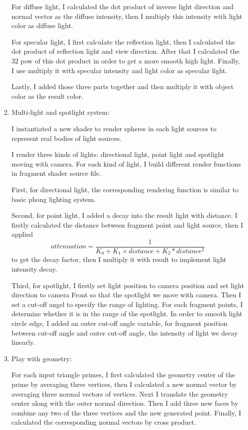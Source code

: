 \documentclass[acmtog]{acmart}
\begin{document}
\begin{enumerate}
	For diffuse light, I calculated the dot product of inverse light direction and normal vector as the diffuse intensity, then I multiply this intensity with light color as diffuse light.\par
	For specular light, I first calculate the reflection light, then I calculated the dot product of reflection light and view direction. After that I calculated the 32 pow of this dot product in order to get a more smooth high light. Finally, I use multiply it with specular intensity and light color as specular light.\par
	Lastly, I added those three parts together and then multiply it with object color as the result color.
	\item Multi-light and spotlight system:\par
	I instantiated a new shader to render spheres in each light sources to represent real bodies of light sources.\par
	I render three kinds of lights: directional light, point light and spotlight moving with camera. For each kind of light, I build different render functions in fragment shader source file.\par
	First, for directional light, the corresponding rendering function is similar to basic phong lighting system.\par
	Second, for point light, I added a decay into the result light with distance. I firstly calculated the distance between fragment point and light source, then I applied \[attenuation = \frac{1}{K_0 + K_1 \times distance + K_2 * distance^2}\] to get the decay factor, then I multiply it with result to implement light intensity decay.\par
	Third, for spotlight, I firstly set light position to camera position and set light direction to camera Front so that the spotlight we move with camera. Then I set a cut-off angel to specify the range of lighting. For each fragment points, I determine whether it is in the range of the spotlight. In order to smooth light circle edge, I added an outer cut-off angle variable, for fragment position between cut-off angle and outer cut-off angle, the intensity of light we decay linearly.
	\item Play with geometry:\par   
	For each input triangle primes, I first calculated the geometry center of the prime by averaging three vertices, then I calculated a new normal vector by averaging three normal vectors of vertices. Next I translate the geometry center along with the outer normal direction. Then I add three new faces by combine any two of the three vertices and the new generated point. Finally, I calculated the corresponding normal vectors by cross product.
	
\end{enumerate}	
\end{document}
